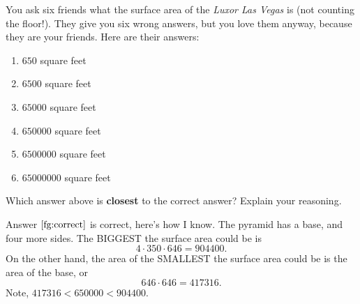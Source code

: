\documentclass[handout,nooutcomes,noauthor,hints1,12pt]{ximera}
\begin{document}
 \begin{question}%
    You ask six friends what the surface area of the \textit{Luxor Las
      Vegas} is (not counting the floor!). They give you six wrong
    answers, but you love them anyway, because they are your
    friends. Here are their answers:
    \begin{enumerate}
    \item $650$ square feet
    \item $6500$ square feet
    \item $65000$ square feet
    \item\label{fg:correct} $650000$ square feet
    \item $6500000$ square feet
    \item $65000000$ square feet
    \end{enumerate}
      Which answer above is \textbf{closest} to the correct answer?
      Explain your reasoning.
      \begin{freeResponse}
        Answer $\ref{fg:correct}$ is correct, here's how I know. The pyramid has a
        base, and four more sides. The BIGGEST the surface area could
        be is
        \[
        4\cdot 350\cdot 646 = 904400.
        \]
        On the other hand, the area of the SMALLEST the surface area could be is
        the area of the base, or
        \[
        646\cdot 646 = 417316.
        \]
        Note, $417316 < 650000 <  904400$.        
      \end{freeResponse}
\end{question}
\end{document}

